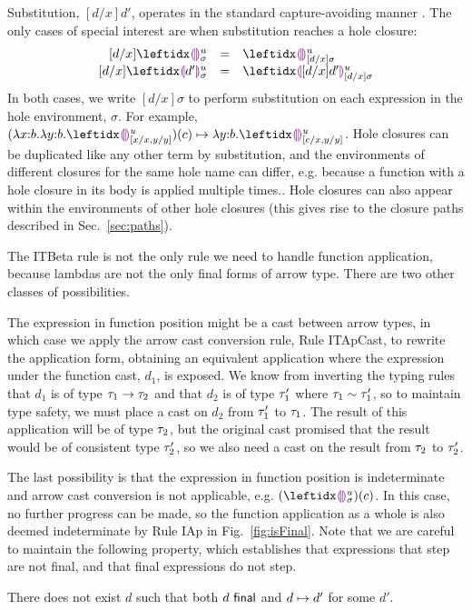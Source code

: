 Substitution, $[d/x]d'$, operates in the standard capture-avoiding manner \cite{pfpl}. The only cases of special interest are when substitution reaches a hole closure:
\[
\begin{array}{rcl}
  [d/x]\dehole{u}{\sigma}{} & = & \dehole{u}{[d/x]\sigma}{} \\%
  \substitute{d}{x}{\dhole{d'}{u}{\sigma}{}} & = & \dhole{[d/x]d'}{u}{[d/x]\sigma}{}
\end{array}
\]
In both cases, we write $[d/x]\sigma$ to perform substitution on each expression in the hole environment, $\sigma$. For example, $\stepsToD{}{\hap{(\halam{x}{b}{\halam{y}{b}{\dehole{u}{[x/x, y/y]}{}}})}{c}}{\halam{y}{b}{\dehole{u}{[c/x, y/y]}{}}}$. Hole closures can be duplicated like any other term by substitution, and the environments of different closures for the same hole name can differ, e.g. because a function with a hole closure in its body is applied multiple times.. Hole closures can also appear within the environments of other hole closures (this gives rise to the closure paths described in Sec.~\ref{sec:paths}).%

The ITBeta rule is not the only rule we need to handle function application, because lambdas are not the only final forms of arrow type. There are two other classes of possibilities. 

The expression in function position might be a cast between arrow types, in which case we apply the arrow cast conversion rule, Rule {ITApCast}, to rewrite the application form, obtaining an equivalent application where the expression under the function cast, $d_1$, is exposed. We know from inverting the typing rules that $d_1$ is of type $\tau_1 \rightarrow \tau_2$ and that $d_2$ is of type $\tau_1'$ where $\tau_1 \sim \tau_1'$, so to maintain type safety, we must place a cast on $d_2$ from  $\tau_1'$ to $\tau_1$. The result of this application will be of type $\tau_2$, but the original cast promised that the result would be of consistent type $\tau_2'$, so we also need a cast on the result from $\tau_2$ to $\tau_2'$.

The last possibility is that the expression in function position is indeterminate and arrow cast conversion is not applicable, e.g. $\hap{(\dehole{u}{\sigma}{})}{c}$. In this case, no further progress can be made, so the function application as a whole is also deemed indeterminate by Rule {IAp} in Fig.~\ref{fig:isFinal}. Note that we are careful to maintain the following property, which establishes that expressions that step are not final, and that final expressions do not step.
\begin{thm}[Finality] There does not exist $d$ such that both $d~\mathsf{final}$ and $d \mapsto d'$ for some $d'$.
\end{thm}

